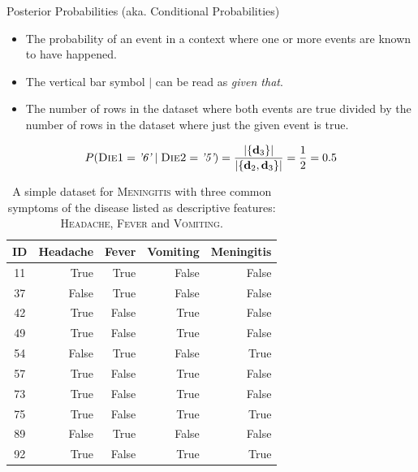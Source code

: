 \documentclass[xcolor={table}]{beamer}
\newcommand{\featN}[1]{\textsc{#1}}
\newcommand{\featL}[1]{\textit{'#1'}}
\begin{document}
\begin{frame}
\begin{alertblock}{Posterior Probabilities (aka. Conditional Probabilities)}

\begin{itemize}
	\item The probability of an event in a context where one or more events are known to have happened.
	\item The vertical bar symbol  $|$ can be read as \textit{given that}.
	\item The number of rows in the dataset where both events are true divided by the number of rows in the dataset where just the given event is true.
\end{itemize}
\end{alertblock}
\begin{example}
\begin{equation*}
P(\featN{Die1}=\featL{6} \mid \featN{Die2}=\featL{5}) = \frac{|\{ \mathbf{d}_3 \}|}{|\{ \mathbf{d}_2, \mathbf{d}_3 \}|}=\frac{1}{2}=0.5
\end{equation*}
\end{example}
\end{frame}



 \begin{frame} 
\begin{table}[!tb]
\caption{A simple dataset for \featN{Meningitis} with three common symptoms of the disease listed as descriptive features: \featN{Headache}, \featN{Fever} and \featN{Vomiting}.}
\label{table:probExample1}
\centering
\begin{footnotesize}
\begin{tabular}{crrrr}
\hline
\textbf{ID} & \textbf{Headache} & \textbf{Fever} & \textbf{Vomiting} & \textbf{Meningitis}\\
\hline
11 & True & True & False & False\\
37 & False & True & False & False\\
42 & True & False & True & False\\
49 & True & False & True & False\\
54 & False & True & False & True\\
57 & True & False & True & False\\
73 & True & False & True & False\\
75 & True & False & True & True\\
89 & False & True & False & False\\
92 & True & False & True & True\\
\hline
\end{tabular}
\end{footnotesize}
\end{table}
\end{frame} 
\end{document}
